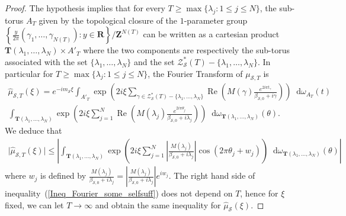 \documentclass[a4paper,10pt]{amsart}
\theoremstyle{plain}
\theoremstyle{definition}
\begin{document}
\begin{proof}
The hypothesis implies that for every $T\geq \max\lbrace\lambda_{j} : 1\leq j\leq N \rbrace$, 
the sub-torus $A_{T}$ given by
the topological closure of the $1$-parameter group 
$\left\lbrace \frac{y}{2\pi} \left(\gamma_{1},\ldots,\gamma_{N(T)}\right) : y\in\mathbf{R} \right\rbrace/\mathbf{Z}^{N(T)}$
can be written as a cartesian product $\mathbf{T}(\lambda_{1},\ldots,\lambda_{N}) \times A'_{T}$
where the two components are respectively the sub-torus associated with the set $\lbrace \lambda_{1},\ldots,\lambda_{N}\rbrace$
and the set $\mathcal{Z}_{\mathcal{S}}^{*}(T) - \lbrace \lambda_{1},\ldots,\lambda_{N}  \rbrace$.
In particular for $T\geq \max\lbrace\lambda_{j} : 1\leq j\leq N \rbrace$,
the Fourier Transform of $\mu_{\mathcal{S},T}$ is
\begin{multline*}
\hat{\mu}_{\mathcal{S},T}(\xi) = e^{-im_{\mathcal{S}}\xi}
\int_{A'_{T}}\exp\left(2i\xi \sum_{\gamma\in\mathcal{Z}_{\mathcal{S}}^{*}(T)-\lbrace\lambda_{1},\ldots,\lambda_{N}\rbrace}\operatorname{Re}\left(M(\gamma)\frac{e^{2i\pi t_{\gamma}}}{\beta_{\mathcal{S},0}+i\gamma}\right) \right){\mathop{}\!\mathrm{d}} \omega_{A_{T}}(t) \\
\int_{\mathbf{T}(\lambda_{1},\ldots,\lambda_{N})}\exp\left(2i\xi \sum_{j=1}^{N}\operatorname{Re}\left(M(\lambda_{j})\frac{e^{2i\pi \theta_{j}}}{\beta_{\mathcal{S},0}+i\lambda_{j}}\right) \right){\mathop{}\!\mathrm{d}}\omega_{\mathbf{T}(\lambda_{1},\ldots,\lambda_{N})}(\theta).
\end{multline*}
We deduce that
\begin{align}\label{Ineq_Fourier_some_selfsuff}
\lvert\hat{\mu}_{\mathcal{S},T}(\xi) \rvert \leq \left\lvert 
\int_{\mathbf{T}(\lambda_{1},\ldots,\lambda_{N})}\exp\left(2i\xi \sum_{j=1}^{N}\left\lvert\frac{M(\lambda_{j})}{\beta_{\mathcal{S},0}+i\lambda_{j}}\right\rvert \cos(2\pi \theta_{j} + w_{j}) \right){\mathop{}\!\mathrm{d}}\omega_{\mathbf{T}(\lambda_{1},\ldots,\lambda_{N})}(\theta)
\right\rvert
\end{align}
where $w_{j}$ is defined by $\frac{M(\lambda_{j})}{\beta_{\mathcal{S},0}+i\lambda_{j}} = \left\lvert \frac{M(\lambda_{j})}{\beta_{\mathcal{S},0}+i\lambda_{j}}\right\rvert e^{iw_{j}}$.
The right hand side of inequality~(\ref{Ineq_Fourier_some_selfsuff}) does not depend on $T$, hence for $\xi$ fixed, we can let $T\rightarrow\infty$ and obtain the same inequality for $\hat{\mu}_{\mathcal{S}}(\xi)$.


\end{proof}
\end{document}
